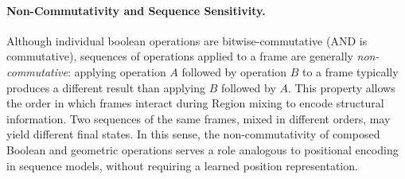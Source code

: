 \paragraph{Non-Commutativity and Sequence Sensitivity.}
Although individual boolean operations are bitwise-commutative (AND is
commutative), sequences of operations applied to a frame are generally
\emph{non-commutative}: applying operation $A$ followed by operation $B$
to a frame typically produces a different result than applying $B$
followed by $A$.  This property allows the order in which frames
interact during Region mixing to encode structural information.  Two
sequences of the same frames, mixed in different orders, may yield
different final states.  In this sense, the non-commutativity of
composed Boolean and geometric operations serves a role analogous to
positional encoding in sequence models, without requiring a learned
position representation.
